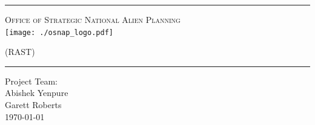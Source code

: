 \begin{titlepage}
\begin{center}

\rule{\linewidth}{0.5mm}

\textsc{\large Office of Strategic National Alien Planning}
~\\[1cm]
\texttt{[image: ./osnap\_logo.pdf]}~\\[1cm]

{\Huge \linespread{2}}

\vspace{10pt}

\textsc{\Large (RAST)}

\rule{\linewidth}{0.5mm}

\vfill

Project Team:\\
Abishek Yenpure\\
Garett Roberts\\

\vfill
{\large \today}

\end{center}
\end{titlepage}
